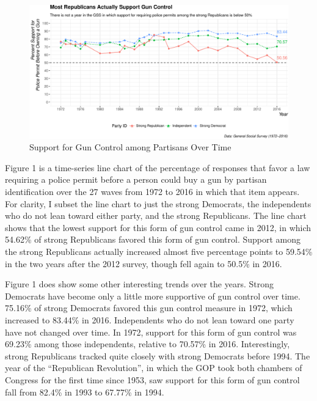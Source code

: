\documentclass[11pt,]{article}
\makeatletter
\def\maxwidth{\ifdim\Gin@nat@width>\linewidth\linewidth
\else\Gin@nat@width\fi}
\let\Oldincludegraphics\includegraphics
\renewcommand{\includegraphics}[1]{\Oldincludegraphics[width=\maxwidth]{#1}}
\makeatother
\begin{document}
\begin{figure}[htbp]
\centering
\includegraphics{gss-guns_files/figure-latex/ts1-1.pdf}
\caption{Support for Gun Control among Partisans Over Time}
\end{figure}

Figure 1 is a time-series line chart of the percentage of responses that
favor a law requiring a police permit before a person could buy a gun by
partisan identification over the 27 waves from 1972 to 2016 in which
that item appears. For clarity, I subset the line chart to just the
strong Democrats, the independents who do not lean toward either party,
and the strong Republicans. The line chart shows that the lowest support
for this form of gun control came in 2012, in which 54.62\% of strong
Republicans favored this form of gun control. Support among the strong
Republicans actually increased almost five percentage points to 59.54\%
in the two years after the 2012 survey, though fell again to 50.5\% in
2016.

Figure 1 does show some other interesting trends over the years. Strong
Democrats have become only a little more supportive of gun control over
time. 75.16\% of strong Democrats favored this gun control measure in
1972, which increased to 83.44\% in 2016. Independents who do not lean
toward one party have not changed over time. In 1972, support for this
form of gun control was 69.23\% among those independents, relative to
70.57\% in 2016. Interestingly, strong Republicans tracked quite closely
with strong Democrats before 1994. The year of the ``Republican
Revolution'', in which the GOP took both chambers of Congress for the
first time since 1953, saw support for this form of gun control fall
from 82.4\% in 1993 to 67.77\% in 1994.
\end{document}

